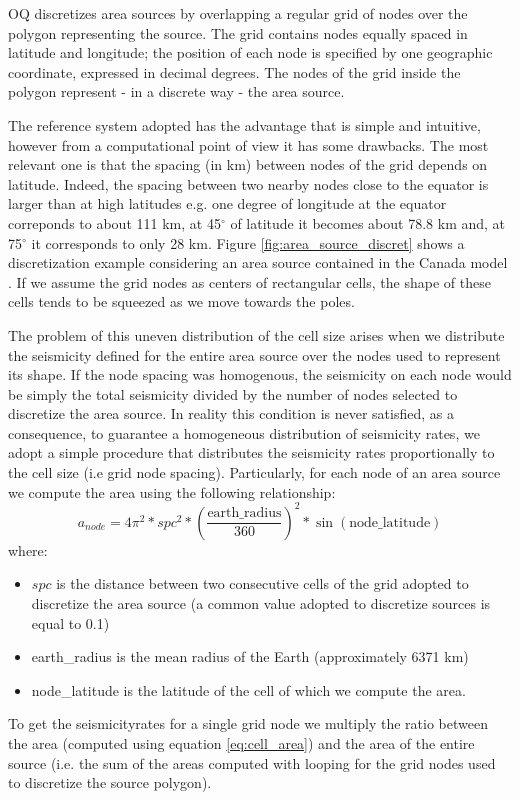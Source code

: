 %
OQ discretizes area sources by overlapping a regular grid of nodes
over the polygon representing the source. The grid contains nodes 
equally spaced in latitude and longitude; the position of each node
is specified by one geographic coordinate, expressed in decimal degrees. 
The nodes of the grid inside the polygon represent - in a discrete way - 
the area source.

The reference system adopted has the advantage that is simple and 
intuitive, however from a computational point of view it has some 
drawbacks. The most relevant one is that the spacing (in km) between 
nodes of the grid depends on latitude. 
%
Indeed, the spacing between two nearby nodes close to the equator is 
larger than at high latitudes e.g. one degree of longitude at the equator 
correponds to about 111 km, at 45$^\circ$ of latitude it becomes 
about 78.8 km and, at 75$^\circ$ it corresponds to only 28 km. 
%
Figure \ref{fig:area_source_discret} shows a discretization example 
considering an area source contained in the Canada model \citep{adams2003}. 
%
If we assume the grid nodes as centers of rectangular cells, the shape
of these cells tends to be squeezed as we move towards the poles.

The problem of this uneven distribution of the cell size arises when we 
distribute the seismicity defined for the entire area source over the 
nodes used to represent its shape. If the node spacing was homogenous,
the seismicity on each node would be simply the total seismicity divided 
by the number of nodes selected to discretize the area source.
%
In reality this condition is never satisfied, as a consequence, to 
guarantee a homogeneous distribution of seismicity rates,
we adopt a simple procedure that distributes the seismicity rates 
proportionally to the cell size (i.e grid node spacing).
%
Particularly, for each node of an area source we compute the area using
the following relationship:
\begin{equation}
	a_{node} = 4\pi^2 * spc^2 *  
 	\left(\frac{\text{earth\_radius}}{360}\right)^2 * 
 	\sin(\text{node\_latitude})
\label{eq:cell_area}
\end{equation}
where:
\begin{itemize}
\item $spc$ is the distance between two consecutive cells 
	of the grid adopted to discretize the area source (a common value 
	adopted to discretize sources is equal to 0.1)
\item earth\_radius is the mean radius of the Earth (approximately 
	6371 km) 
\item node\_latitude is the latitude of the cell of which we compute
	the area.
\end{itemize}
%
To get the \glspl{seismicityrate} for a single grid node we multiply the 
ratio between the area (computed using equation \ref{eq:cell_area}) and 
the area of the entire source (i.e. the sum of the areas computed 
with looping for the grid nodes used to discretize the source polygon).
%
